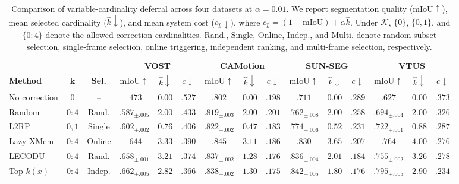 \begin{table}[t]
\caption{
Comparison of variable-cardinality deferral across four datasets at
\(\alpha=0.01\). We report segmentation quality
(\(\mathrm{mIoU}\uparrow\)), mean selected cardinality
(\(\widehat{k}\downarrow\)), and mean system cost
(\(c_{\widehat{k}}\downarrow\)), where
\(c_{\widehat{k}}=(1-\mathrm{mIoU})+\alpha\widehat{k}\).
Under \(\mathcal{K}\), \(\{0\}\), \(\{0,1\}\), and \(\{0{:}4\}\) denote
the allowed correction cardinalities. Rand., Single, Online, Indep., and
Multi. denote random-subset selection, single-frame selection, online
triggering, independent ranking, and multi-frame selection, respectively.
}
\label{tab:overall_comparison}

\centering
\small
\setlength{\tabcolsep}{2pt}
\renewcommand{\arraystretch}{1.0}
\begin{tabular}{@{}lcc|ccc|ccc|ccc|ccc@{}}
\toprule
& & & \multicolumn{3}{c|}{\textbf{VOST}} & \multicolumn{3}{c|}{\textbf{CAMotion}} & \multicolumn{3}{c|}{\textbf{SUN-SEG}} & \multicolumn{3}{c}{\textbf{VTUS}} \\
\textbf{Method} & $\boldsymbol{k}$ & \textbf{Sel.}
 & mIoU$\uparrow$ & $\hat{k}\!\downarrow$ & $c\!\downarrow$
 & mIoU$\uparrow$ & $\hat{k}\!\downarrow$ & $c\!\downarrow$
 & mIoU$\uparrow$ & $\hat{k}\!\downarrow$ & $c\!\downarrow$
 & mIoU$\uparrow$ & $\hat{k}\!\downarrow$ & $c\!\downarrow$ \\
\midrule
No correction & $0$ & -- & $.473$ & $0.00$ & $.527$ & $.802$ & $0.00$ & $.198$ & $.711$ & $0.00$ & $.289$ & $.627$ & $0.00$ & $.373$ \\
Random & $0{:}4$ & Rand. & $.587_{\pm.005}$ & $2.00$ & $.433$ & $.819_{\pm.003}$ & $2.00$ & $.201$ & $.762_{\pm.008}$ & $2.00$ & $.258$ & $.694_{\pm.004}$ & $2.00$ & $.326$ \\
L2RP~\cite{rasanjalee2026understanding} & $0{,}1$ & Single & $.602_{\pm.002}$ & $0.76$ & $.406$ & $.822_{\pm.002}$ & $0.47$ & $.183$ & $.774_{\pm.006}$ & $0.52$ & $.231$ & $.722_{\pm.001}$ & $0.88$ & $.287$ \\
Lazy-XMem~\cite{vujasinovic2024strike} & $0{:}4$ & Online & $.644$ & $3.33$ & $.390$ & $.845$ & $3.11$ & $.186$ & $.830$ & $3.65$ & $.207$ & $.764$ & $4.00$ & $.276$ \\
LECODU~\cite{zhang2024learning} & $0{:}4$ & Rand. & $.658_{\pm.001}$ & $3.21$ & $.374$ & $.837_{\pm.002}$ & $1.28$ & $.176$ & $.836_{\pm.004}$ & $2.01$ & $.184$ & $.755_{\pm.002}$ & $3.26$ & $.278$ \\
Top-$k(x)$~\cite{montreuil2025ask} & $0{:}4$ & Indep. & $.662_{\pm.005}$ & $2.82$ & $.366$ & $.838_{\pm.002}$ & $1.30$ & $.175$ & $.842_{\pm.005}$ & $1.80$ & $.176$ & $.795_{\pm.005}$ & $2.90$ & $.234$ \\

\end{tabular}
\end{table}
